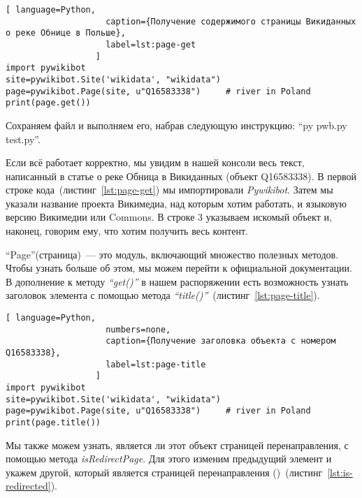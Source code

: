 %
\begin{lstlisting}[ language=Python,
                    caption={Получение содержимого страницы Викиданных о реке Обнице в Польше},
                    label=lst:page-get
                  ]
import pywikibot
site=pywikibot.Site('wikidata', "wikidata")
page=pywikibot.Page(site, u"Q16583338")     # river in Poland
print(page.get())
\end{lstlisting}

Сохраняем файл и выполняем его, набрав следующую инструкцию: ``py pwb.py test.py''.

Если всё работает корректно, мы увидим в нашей консоли весь текст, написанный в статье о реке Обница в Викиданных (объект Q16583338). В первой строке кода~(листинг~\ref{lst:page-get}) мы импортировали \textit{Pywikibot}. Затем мы указали название проекта Викимедиа, над которым хотим работать, и языковую версию Викимедии или Commons. В строке 3 указываем искомый объект и, наконец, говорим ему, что хотим получить весь контент.

``Page''(страница)~--- это модуль, включающий множество полезных методов. Чтобы узнать больше об этом, мы можем перейти к официальной документации. В дополнение к методу \textit{``get()''} в нашем распоряжении есть возможность узнать заголовок элемента с помощью метода \textit{``title()''}~(листинг~\ref{lst:page-title}).

\begin{lstlisting}[ language=Python,
                    numbers=none,
                    caption={Получение заголовка объекта с номером Q16583338},
                    label=lst:page-title
                  ]
import pywikibot
site=pywikibot.Site('wikidata', "wikidata")
page=pywikibot.Page(site, u"Q16583338")     # river in Poland
print(page.title())
\end{lstlisting}

Мы также можем узнать, является ли этот объект страницей перенаправления, с помощью метода \textit{isRedirectPage}. Для этого изменим предыдущий элемент и укажем другой, который является страницей перенаправления ()~(листинг~\ref{lst:is-redirected}).

